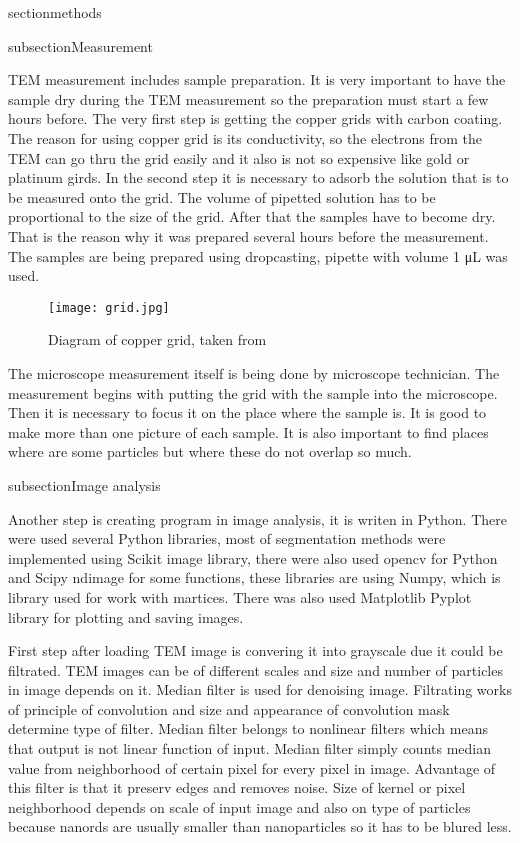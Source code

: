 section{methods}

\pagestyle{plain}

subsection{Measurement}

TEM measurement includes sample preparation. It is very important to have
the sample dry during the TEM measurement so the preparation must start
a few hours before. The very first step is getting the copper grids with carbon
coating. The reason for using copper grid is its conductivity, so the electrons
from the TEM can go thru the grid easily and it also is not so expensive like gold
or platinum girds. In the second step it is necessary to adsorb the solution that is
to be measured onto the grid. The volume of pipetted solution has to be proportional
to the size of the grid. After that the samples have to become dry.
That is the reason why it was prepared several hours before the measurement.
The samples are being prepared using dropcasting, pipette with volume 1 μL was used.

\begin{figure}[h]
    \texttt{[image: grid.jpg]}
    \caption{Diagram of copper grid, taken from \cite{}}
    \label{fig:otsu}
\end{figure}

The microscope measurement itself is being done by microscope technician.
The measurement begins with putting the grid with the sample into the microscope.
Then it is necessary to focus it on the place where the sample is. It is good to make
more than one picture of each sample. It is also important to find places where are
some particles but where these do not overlap so much.

subsection{Image analysis}

Another step is creating program in image analysis, it is writen in Python.
There were used several Python libraries, most of segmentation methods were
implemented using Scikit image library, there were also used opencv for Python
and Scipy ndimage for some functions, these libraries are using Numpy, which
is library used for work with martices. There was also used Matplotlib Pyplot
library for plotting and saving images.

First step after loading TEM image is convering it into grayscale due it could
be filtrated. TEM images can be of different scales and size and number of particles
in image depends on it. Median filter is used for denoising image. Filtrating works
of principle of convolution and size and appearance of convolution mask determine type
of filter. Median filter belongs to nonlinear filters which means that output is not
linear function of input. Median filter simply counts median value from neighborhood
of certain pixel for every pixel in image. Advantage of this filter is that it
preserv edges and removes noise. Size of kernel or pixel neighborhood depends on
scale of input image and also on type of particles because nanords are usually
smaller than nanoparticles so it has to be blured less.

